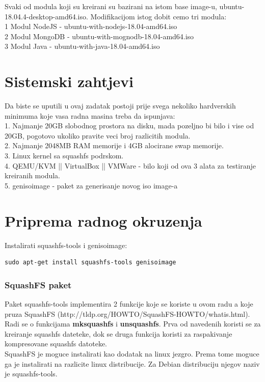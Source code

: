 \documentclass[12pt,vi]{mitthesis}
\begin{document}
Svaki od modula koji su kreirani su bazirani na istom base image-u, ubuntu-18.04.4-desktop-amd64.iso. Modifikacijom istog dobit cemo tri modula:\\ 
1 Modul NodeJS - ubuntu-with-nodejs-18.04-amd64.iso\\
2 Modul MongoDB - ubuntu-with-mognodb-18.04-amd64.iso\\
3 Modul Java - ubuntu-with-java-18.04-amd64.iso\\

\chapter*{Sistemski zahtjevi}
Da biste se uputili u ovaj zadatak postoji prije svega nekoliko hardverskih minimuma koje vasa radna masina treba da ispunjava:\\

1. Najmanje 20GB slobodnog prostora na disku, mada pozeljno bi bilo i vise od 20GB, pogotovo ukoliko pravite veci broj razlicitih modula.\\
2. Najmanje 2048MB RAM memorije i 4GB alocirane swap memorije.\\
3. Linux kernel sa squashfs podrskom.\\
4. QEMU/KVM || VirtualBox || VMWare - bilo koji od ova 3 alata za testiranje kreiranih modula.\\
5. genisoimage - paket za generisanje novog iso image-a\\

\chapter*{Priprema radnog okruzenja}
Instalirati squashfs-tools i genisoimage:
\begin{lstlisting}[style=BashInputStyle]
sudo apt-get install squashfs-tools genisoimage
\end{lstlisting}

\subsection*{SquashFS paket}
Paket squashfs-tools implementira 2 funkcije koje se koriste u ovom radu a koje pruza SquashFS (http://tldp.org/HOWTO/SquashFS-HOWTO/whatis.html).
Radi se o funkcijama \textbf{mksquashfs} i \textbf{unsquashfs}. Prva od navedenih koristi se za kreiranje squashfs dateteke, dok se druga funkcija koristi za raspakivanje kompresovane squashfs datoteke.\\
SquashFS je moguce instalirati kao dodatak na linux jezgro. Prema tome moguce ga je instalirati na razlicite linux distribucije. Za Debian distribuciju njegov naziv je squashfs-tools.
\end{document}
